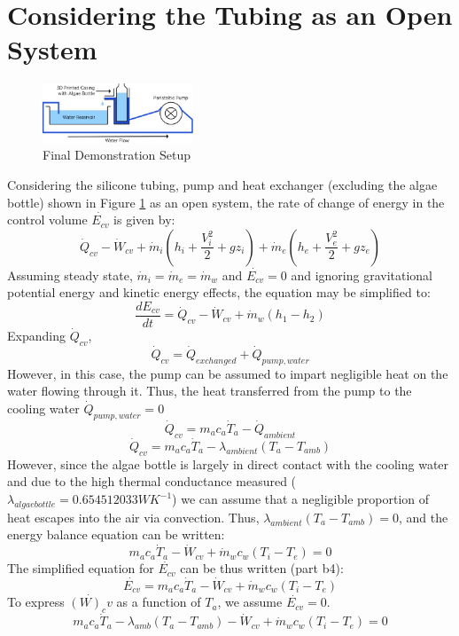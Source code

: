 \documentclass[10pt,a4paper]{IEEEtran}
\begin{document}
	\section{Considering the Tubing as an Open System}
	\begin{figure}[H]
		\begin{center}
			\includegraphics[width=0.4\textwidth]{demo_setup.png}
			\caption{Final Demonstration Setup}
			\label{fig:demo_setup}
		\end{center}
	\end{figure}
	Considering the silicone tubing, pump and heat exchanger (excluding the algae bottle) shown in Figure \ref{fig:demo_setup} as an open system, the rate of change of energy in the control volume $\dot{E_{cv}}$ is given by:
	$$\dot{Q}_{cv} - \dot{W}_{cv} + \dot{m}_{i} \left( h_i + \frac{V_i^2}{2} + gz_i \right) + \dot{m}_{e} \left( h_e + \frac{V_e^2}{2} + gz_e \right)$$
	Assuming steady state, $\dot{m}_{i} = \dot{m}_{e} = \dot{m}_w$ and $\dot{E_{cv}} = 0$ and ignoring gravitational potential energy and kinetic energy effects, the equation may be simplified to:
	$$\frac{dE_{cv}}{dt} = \dot{Q}_{cv} - \dot{W}_{cv} + \dot{m}_w \left( h_1 - h_2 \right)$$
	Expanding $\dot{Q}_{cv}$,
	$$\dot{Q}_{cv} = \dot{Q}_{exchanged} + \dot{Q}_{pump,water}$$
	However, in this case, the pump can be assumed to impart negligible heat on the water flowing through it. Thus, the heat transferred from the pump to the cooling water $\dot{Q}_{pump,water} = 0$
	$$\dot{Q}_{cv} = m_a c_a \dot{T}_a - \dot{Q}_{ambient}$$
	$$\dot{Q}_{cv} = m_a c_a \dot{T}_a - \lambda_{ambient} \left( T_a - T_{amb} \right)$$
	However, since the algae bottle is largely in direct contact with the cooling water and due to the high thermal conductance measured ($\lambda_{algae bottle} = 0.654512033 W K^{-1}$) we can assume that a negligible proportion of heat escapes into the air via convection. Thus, $\lambda_{ambient} \left( T_a - T_{amb} \right) = 0$, and the energy balance equation can be written:
	$$m_a c_a \dot{T}_a - \dot{W}_{cv} + \dot{m}_w c_w ( T_i - T_e ) = 0$$
	The simplified equation for $\dot{E_{cv}}$ can be thus written (part b4):
	$$\dot{E_{cv}} = m_a c_a \dot{T}_a - \dot{W}_{cv} + \dot{m}_w c_w ( T_i - T_e )$$
	To express $\dot{(W)_cv}$ as a function of $T_a$, we assume $\dot{E_{cv}} = 0$.
	$$m_a c_a \dot{T}_a - \lambda_{amb} \left( T_a - T_{amb} \right) - \dot{W}_{cv} + \dot{m}_w c_w \left( T_i - T_e \right) = 0$$
\end{document}
